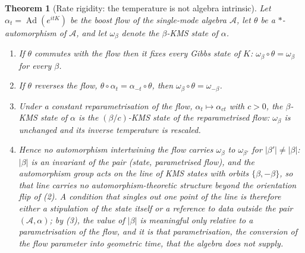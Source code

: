 \documentclass[11pt]{article}
\newtheorem{theorem}{Theorem}[section]
\theoremstyle{definition}
\newcommand{\Aa}{\mathcal{A}}
\begin{document}
\begin{theorem}[Rate rigidity: the temperature is not algebra intrinsic]\label{thm:rigidity}
Let $\alpha_t = \operatorname{Ad}(e^{itK})$ be the boost flow of the single-mode algebra $\Aa$, let $\theta$ be a $*$-automorphism of $\Aa$, and let $\omega_\beta$ denote the $\beta$-KMS state of $\alpha$.
\begin{enumerate}
\item If $\theta$ commutes with the flow then it fixes every Gibbs state of $K$: $\omega_\beta \circ \theta = \omega_\beta$ for every $\beta$.
\item If $\theta$ reverses the flow, $\theta\circ\alpha_t = \alpha_{-t}\circ\theta$, then $\omega_\beta\circ\theta = \omega_{-\beta}$.
\item Under a constant reparametrisation of the flow, $\alpha_t \mapsto \alpha_{ct}$ with $c > 0$, the $\beta$-KMS state of $\alpha$ is the $(\beta/c)$-KMS state of the reparametrised flow: $\omega_\beta$ is unchanged and its inverse temperature is rescaled.
\item Hence no automorphism intertwining the flow carries $\omega_\beta$ to $\omega_{\beta'}$ for $|\beta'| \neq |\beta|$: $|\beta|$ is an invariant of the pair (state, parametrised flow), and the automorphism group acts on the line of KMS states with orbits $\{\beta, -\beta\}$, so that line carries no automorphism-theoretic structure beyond the orientation flip of (2). A condition that singles out one point of the line is therefore either a stipulation of the state itself or a reference to data outside the pair $(\Aa, \alpha)$; by (3), the value of $|\beta|$ is meaningful only relative to a parametrisation of the flow, and it is that parametrisation, the conversion of the flow parameter into geometric time, that the algebra does not supply.
\end{enumerate}
\end{theorem}
\end{document}
